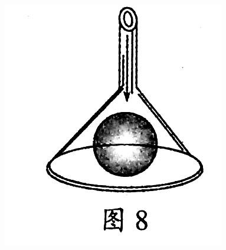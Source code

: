 \documentclass[12pt,twoside]{exam}
\begin{document}
\begin{knowledge}
\begin{questions}
\includegraphics[scale=0.2]{figures/图片10.jpg} 



\end{questions}
\end{knowledge}









%
\end{document}
